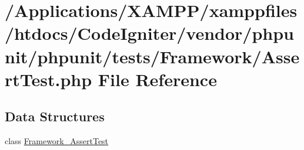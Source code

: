 \hypertarget{_assert_test_8php}{}\section{/\+Applications/\+X\+A\+M\+P\+P/xamppfiles/htdocs/\+Code\+Igniter/vendor/phpunit/phpunit/tests/\+Framework/\+Assert\+Test.php File Reference}
\label{_assert_test_8php}
\subsection*{Data Structures}
\begin{DoxyCompactItemize}
\item 
class \mbox{\hyperlink{class_framework___assert_test}{Framework\+\_\+\+Assert\+Test}}
\end{DoxyCompactItemize}
